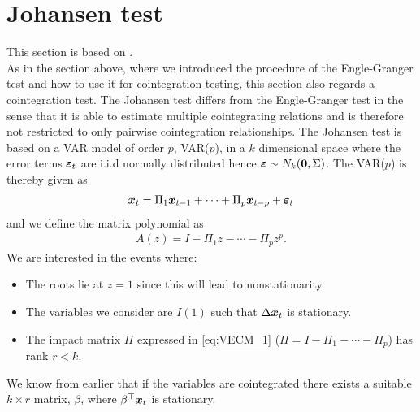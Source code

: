 \section{Johansen test}
This section is based on \cite{Johansen_test}.\\
As in the section above, where we introduced the procedure of the Engle-Granger test and how to use it for cointegration testing, this section also regards a cointegration test. The Johansen test differs from the Engle-Granger test in the sense that it is able to estimate multiple cointegrating relations and is therefore not restricted to only pairwise cointegration relationships. The Johansen test is based on a VAR model of order $p$, VAR($p$), in a $k$ dimensional space where the error terms $\boldsymbol{\varepsilon}_t$ are i.i.d normally distributed hence $\boldsymbol{\varepsilon}\sim N_k(\boldsymbol{0},\Sigma)$. The VAR($p$) is thereby given as
\begin{align}\label{eq:var_p_johansen}
\boldsymbol{x}_t=\Pi_1\boldsymbol{x}_{t-1}+\cdots+\Pi_p\boldsymbol{x}_{t-p}+\boldsymbol{\varepsilon}_t
\end{align}
and we define the matrix polynomial as
\begin{align*}
    A(z)=I-\Pi_1z-\cdots-\Pi_pz^p.
\end{align*}
We are interested in the events where: 
\begin{itemize}
    \item The roots lie at $z=1$ since this will lead to nonstationarity.
    \item The variables we consider are $I(1)$ such that $\Delta \boldsymbol{x}_t$ is stationary.
    \item The impact matrix $\Pi$ expressed in \eqref{eq:VECM_1} ($\Pi=I-\Pi_1-\cdots-\Pi_p$) has rank $r<k$.
\end{itemize}  
We know from earlier that if the variables are cointegrated there exists a suitable $k\times r$ matrix, $\beta$, where $\beta^\top \boldsymbol{x}_t$ is stationary.\\\\






